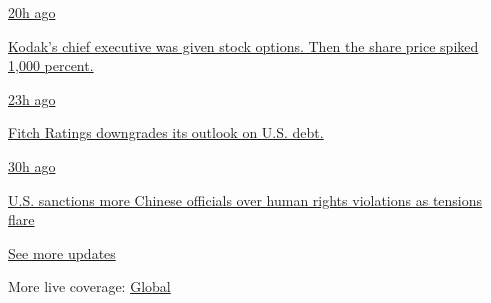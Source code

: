 \href{https://www.nytimes3xbfgragh.onion/live/2020/07/31/business/stock-market-today-coronavirus?action=click\&pgtype=Article\&state=default\&region=MAIN_CONTENT_1\&context=storylines_live_updates\#kodaks-chief-executive-was-given-stock-options-then-the-share-price-spiked-1000-percent}{20h
ago}

\href{https://www.nytimes3xbfgragh.onion/live/2020/07/31/business/stock-market-today-coronavirus?action=click\&pgtype=Article\&state=default\&region=MAIN_CONTENT_1\&context=storylines_live_updates\#kodaks-chief-executive-was-given-stock-options-then-the-share-price-spiked-1000-percent}{Kodak's
chief executive was given stock options. Then the share price spiked
1,000 percent.}

\href{https://www.nytimes3xbfgragh.onion/live/2020/07/31/business/stock-market-today-coronavirus?action=click\&pgtype=Article\&state=default\&region=MAIN_CONTENT_1\&context=storylines_live_updates\#fitch-ratings-downgrades-its-outlook-on-us-debt}{23h
ago}

\href{https://www.nytimes3xbfgragh.onion/live/2020/07/31/business/stock-market-today-coronavirus?action=click\&pgtype=Article\&state=default\&region=MAIN_CONTENT_1\&context=storylines_live_updates\#fitch-ratings-downgrades-its-outlook-on-us-debt}{Fitch
Ratings downgrades its outlook on U.S. debt.}

\href{https://www.nytimes3xbfgragh.onion/live/2020/07/31/business/stock-market-today-coronavirus?action=click\&pgtype=Article\&state=default\&region=MAIN_CONTENT_1\&context=storylines_live_updates\#us-sanctions-more-chinese-officials-over-human-rights-violations-as-tensions-flare}{30h
ago}

\href{https://www.nytimes3xbfgragh.onion/live/2020/07/31/business/stock-market-today-coronavirus?action=click\&pgtype=Article\&state=default\&region=MAIN_CONTENT_1\&context=storylines_live_updates\#us-sanctions-more-chinese-officials-over-human-rights-violations-as-tensions-flare}{U.S.
sanctions more Chinese officials over human rights violations as
tensions flare}

\href{https://www.nytimes3xbfgragh.onion/live/2020/07/31/business/stock-market-today-coronavirus?action=click\&pgtype=Article\&state=default\&region=MAIN_CONTENT_1\&context=storylines_live_updates}{See
more updates}

More live coverage:
\href{https://www.nytimes3xbfgragh.onion/2020/08/01/world/coronavirus-covid-19.html?action=click\&pgtype=Article\&state=default\&region=MAIN_CONTENT_1\&context=storylines_live_updates}{Global}

